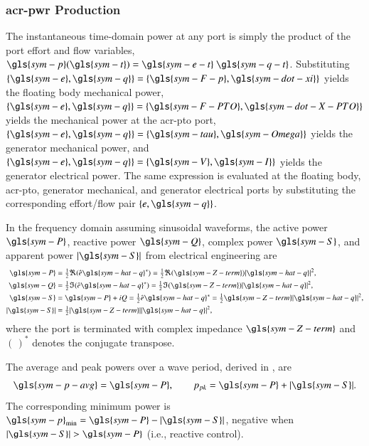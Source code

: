 \subsubsection{\gls{acr-pwr} Production}\label{sec:power}
The instantaneous time-domain power at any port is simply the product of the port effort and flow variables, $\gls{sym-p}(\gls{sym-t}) = \gls{sym-e-t}~\gls{sym-q-t}$.
\ifdefined\DISSERTATION
    Substituting $\{\gls{sym-e},\gls{sym-q}\}=\{\gls{sym-F-p},\gls{sym-dot-xi}\}$ yields the floating body mechanical power,
    $\{\gls{sym-e},\gls{sym-q}\}=\{\gls{sym-F-PTO},\gls{sym-dot-X-PTO}\}$ yields the mechanical power at the \gls{acr-pto} port,
    $\{\gls{sym-e},\gls{sym-q}\}=\{\gls{sym-tau},\gls{sym-Omega}\}$ yields the generator mechanical power,
    and $\{\gls{sym-e},\gls{sym-q}\}=\{\gls{sym-V},\gls{sym-I}\}$ yields the generator electrical power.
\else
    The same expression is evaluated at the floating body, \gls{acr-pto}, generator mechanical, and generator electrical ports by substituting the corresponding effort/flow pair $\{e,\gls{sym-q}\}$.
\fi

In the frequency domain assuming sinusoidal waveforms, the active power $\gls{sym-P}$, reactive power $\gls{sym-Q}$, complex power $\gls{sym-S}$, and apparent power $|\gls{sym-S}|$ from electrical engineering \citep{saadat_power_1999} are
\begin{equation}\label{eq:power-PQS}
\begin{aligned}
    \gls{sym-P} &= \tfrac{1}{2}\Re (\hat{e}\gls{sym-hat-q}^*) = \tfrac{1}{2}\Re (\gls{sym-Z-term})|\gls{sym-hat-q}|^2,\\
    \gls{sym-Q} &= \tfrac{1}{2}\Im (\hat{e}\gls{sym-hat-q}^*) = \tfrac{1}{2}\Im (\gls{sym-Z-term})|\gls{sym-hat-q}|^2, \\
    \gls{sym-S} &= \gls{sym-P} + iQ = \tfrac{1}{2}\hat{e}\gls{sym-hat-q}^* = \tfrac{1}{2}\gls{sym-Z-term}|\gls{sym-hat-q}|^2, \\
    |\gls{sym-S}| &= \tfrac{1}{2}|\gls{sym-Z-term}||\gls{sym-hat-q}|^2,
\end{aligned}
\end{equation}
where the port is terminated with complex impedance $\gls{sym-Z-term}$ and $(\,)^*$ denotes the conjugate transpose.

The average and peak powers over a wave period, derived in , are
\begin{equation}\label{eq:power-avg-peak}
    \gls{sym-p-avg} = \gls{sym-P}, \qquad p_{pk} = \gls{sym-P} + |\gls{sym-S}|.
\end{equation}
The corresponding minimum power is $\gls{sym-p}_{\text{min}} = \gls{sym-P} - |\gls{sym-S}|$, negative when $|\gls{sym-S}|>\gls{sym-P}$ (i.e., reactive control).

